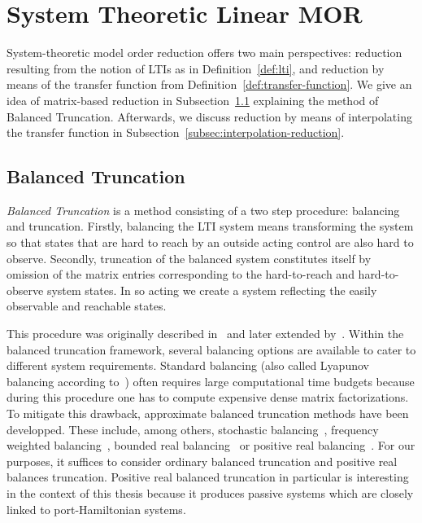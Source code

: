 \section{System Theoretic Linear MOR}\label{sec:system-mor}

System-theoretic model order reduction offers two main perspectives: reduction resulting from the notion of LTIs as in Definition~\ref{def:lti}, and reduction by means of the transfer function from Definition~\ref{def:transfer-function}.
We give an idea of matrix-based reduction in Subsection~\ref{subsec:balanced-truncation} explaining the method of Balanced Truncation.
Afterwards, we discuss reduction by means of interpolating the transfer function in Subsection~\ref{subsec:interpolation-reduction}.

\subsection{Balanced Truncation}\label{subsec:balanced-truncation}

\emph{Balanced Truncation} is a method consisting of a two step procedure: balancing and truncation.
Firstly, balancing the LTI system means transforming the system so that states that are hard to reach by an outside acting control are also hard to observe.
Secondly, truncation of the balanced system constitutes itself by omission of the matrix entries corresponding to the hard-to-reach and hard-to-observe system states.
In so acting we create a system reflecting the easily observable and reachable states.

This procedure was originally described in~\cite{Mullis1976} and later extended by~\cite{Moore1981, Enns1984}.
Within the balanced truncation framework, several balancing options are available to cater to different system requirements.
Standard balancing (also called Lyapunov balancing according to~\cite{Gugercin2007}) often requires large computational time budgets because during this procedure one has to compute expensive dense matrix factorizations.
To mitigate this drawback, approximate balanced truncation methods have been developped.
These include, among others, stochastic balancing~\cite{Desai1984, Green1988}, frequency weighted balancing~\cite{Enns1984, Wang1999}, bounded real balancing~\cite{Opdenacker1988, Reis2009} or positive real balancing~\cite{Desai1984, Ober1991}.
For our purposes, it suffices to consider ordinary balanced truncation and positive real balances truncation.
Positive real balanced truncation in particular is interesting in the context of this thesis because it produces passive systems which are closely linked to port-Hamiltonian systems.

